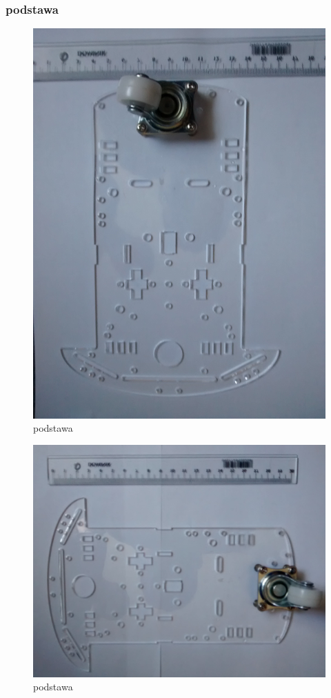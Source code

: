 \documentclass[a4paper,11pt]{article}
\def\SCALE{0.6}
\begin{document}
\subsubsection{podstawa}
\begin{figure}[H]
	\centering
	\includegraphics[width=\SCALE
	\paperwidth]{podstawa-1}
	\caption{podstawa}
\end{figure}

\begin{figure}[H]
	\centering
	\includegraphics[width=\SCALE
	\paperwidth]{podstawa-2}
	\caption{podstawa}
\end{figure}
\end{document}
